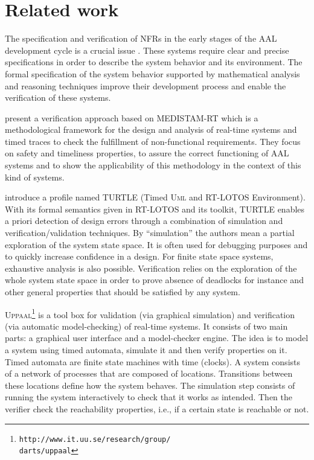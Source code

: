 \documentclass[a4paper,twoside]{article}
\def\UML{\textsc{Uml}}
\def\uppaal{\textsc{Uppaal}}
\begin{document}
\section{Related work}
\label{sec:r_work}

\noindent The specification and verification of NFRs in the early stages of the AAL development cycle is a crucial issue \cite{KBenghazi2009}. These systems require clear and precise specifications in order to describe the system behavior and its environment. The formal specification of the system behavior supported by mathematical analysis and reasoning techniques improve their development process and enable the verification of these systems. 

\cite{JNehmer2006} present a verification approach based on MEDISTAM-RT which is a methodological framework for the design and analysis of real-time systems and timed traces to check the fulfillment of non-functional requirements. They focus on  safety and timeliness properties, to assure the correct functioning of AAL systems and to show the applicability of this methodology in the context of this kind of systems. 

\cite{LApvrille2006} introduce a profile named TURTLE (Timed \UML{} and RT-LOTOS Environment). With its formal semantics given in RT-LOTOS and its toolkit, TURTLE enables a priori detection of design errors through a combination of simulation and verification/validation techniques. By “simulation” the authors mean a partial exploration of the system state space. It is often used for debugging purposes and to quickly increase confidence in a design. For finite state space systems, exhaustive analysis is also possible. Verification relies 
on the exploration of the whole system state space in order to prove absence of deadlocks for instance and other general properties that should be satisfied by any system.

\uppaal{}\footnote{\texttt{http://www.it.uu.se/research/group/\\darts/uppaal}} is a tool box for validation (via graphical simulation) and verification (via automatic model-checking) of real-time systems. It consists of two main parts: a graphical user interface and a model-checker engine. The idea is to model a system using timed automata, simulate it and then verify properties on it. Timed automata are finite state machines with time (clocks). A system consists of a network of processes that are composed of locations. Transitions between these locations define how the system behaves. The simulation step consists of running the system interactively to check that it works as intended. Then the verifier check the reachability properties, i.e., if a certain state is reachable or not. 
\end{document}
